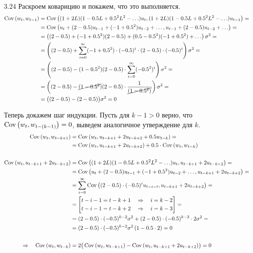 \begin{solution}{{3.24}}
Раскроем коварицию и покажем, что это выполняется.
\begin{align*}
    \operatorname{Cov}{\left(w_t, w_{t-1}\right)} &= \operatorname{Cov}{\left((1 + 2L) (1 - 0.5L + 0.5^2 L^2 - \ldots)u_t, (1 + 2L) (1 - 0.5L + 0.5^2 L^2 - \ldots)u_{t-1}\right)} = \\
    &= \operatorname{Cov}{\left(u_t + (2 - 0.5)u_{t-1} + (-1 +0.5^2)u_{t-2} + \ldots, u_{t-1} + (2 - 0.5)u_{t-2} + \ldots\right)} = \\
    &= \left((2 - 0.5) + (-1 + 0.5^2)(2 - 0.5) + (0.5 - 0.5^3)(-1 + 0.5^2) + \ldots\right) \sigma^2 = \\
    &= \left((2 - 0.5) + \sum_{i = 0}^{\infty}(-1 + 0.5^2)\cdot (-0.5)^i \cdot (2 - 0.5) \cdot (-0.5)^i\right) \sigma^2 = \\
    &= \left((2 - 0.5) - (1 - 0.5^2)(2 - 0.5)\cdot \sum_{i = 0}^{\infty}(-0.5^2)^i\right) \sigma^2 = \\
    &= \left((2 - 0.5) - \cancel{(1 - 0.5^2)}(2 - 0.5)\cdot \frac{1}{\cancel{(1 - 0.5^2)}}\right) \sigma^2 = \\
    &= \big((2 - 0.5) - (2 - 0.5)\big) \sigma^2 = 0 \\
\end{align*}

Теперь докажем шаг индукции. Пусть для $k-1 > 0$ верно, что $\operatorname{Cov}{\left(w_t, w_{t-(k-1)}\right)} = 0$, выведем аналогичное утверждение для $k$.
\begin{align*}
    \operatorname{Cov}{\left(w_t, w_{t-k+1}\right)} &= \operatorname{Cov}{\left(w_t, u_{t-k+1} + 2u_{t-k+2} + 0.5w_{t-k}\right)} = \\
    &= \operatorname{Cov}{\left(w_t, u_{t-k+1} + 2u_{t-k+2}\right)} + 0.5 \cdot \operatorname{Cov}{\left(w_t, w_{t-k}\right)} \\ \\
    \operatorname{Cov}{\left(w_t, u_{t-k+1} + 2u_{t-k+2}\right)} &= \operatorname{Cov}{\left((1 + 2L) (1 - 0.5L + 0.5^2 L^2 - \ldots)u_t, u_{t-k+1} + 2u_{t-k+2}\right)} = \\
    &= \operatorname{Cov}{\left(u_t + (2 - 0.5)u_{t-1} + (-1 +0.5^2)u_{t-2} + \ldots, u_{t-k+1} + 2u_{t-k+2}\right)} = \\
    &= \sum_{i=0}^{\infty} \operatorname{Cov}{\left((2 - 0.5) \cdot (-0.5)^i u_{t-i-t}, u_{t-k+1} + 2u_{t-k+2}\right)} = \\
    &= \left[\begin{aligned}
        t - i - 1 = t - k + 1 \quad \Rightarrow \quad i = k - 2 \\
        t - i - 1 = t - k + 2 \quad \Rightarrow \quad i = k - 3 \\
    \end{aligned}\right] = \\
    &= (2 - 0.5) \cdot (-0.5)^{k-2} \sigma^2 + (2 - 0.5) \cdot (-0.5)^{k-3}\cdot 2 \sigma^2 = \\
    &= (2 - 0.5) \cdot (-0.5)^{k-2} \sigma^2 \left(1 - 0.5 \cdot 2\right) = 0 \\ \\
    \Rightarrow \quad \operatorname{Cov}{\left(w_t, w_{t-k}\right)} &= 2\big(\operatorname{Cov}{\left(w_t, w_{t-k+1}\right)} - \operatorname{Cov}{\left(w_t, u_{t-k+1} + 2u_{t-k+2}\right)}\big) = 0
\end{align*}


\end{solution}
